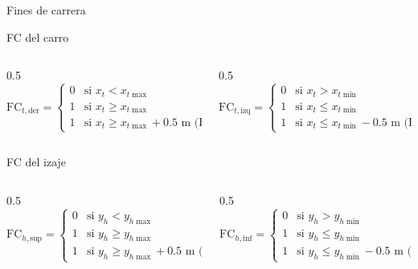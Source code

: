 \begin{frame}{Fines de carrera}
  \begin{block}{FC del carro}
    \vspace{0.2cm}
    \begin{columns}[T]
      \begin{column}{0.5\textwidth}
        \[
        \text{FC}_{t,\text{der}} = 
        \begin{cases} 
          0 & \text{si } x_t < x_{t\max} \\[4pt]
          1 & \text{si } x_t \ge x_{t\max} \\[4pt]
          1 & \text{si } x_t \ge x_{t\max} + 0.5 \text{ m (E)}
        \end{cases}
        \]
      \end{column}
      \begin{column}{0.5\textwidth}
        \[
        \text{FC}_{t,\text{izq}} = 
        \begin{cases} 
          0 & \text{si } x_t > x_{t\min} \\
          1 & \text{si } x_t \le x_{t\min} \\[4pt]
          1 & \text{si } x_t \le x_{t\min} - 0.5 \text{ m (E)}
        \end{cases}
        \]
      \end{column}
    \end{columns}
  \end{block}
    \begin{block}{FC del izaje}
    \vspace{0.2cm}
    \begin{columns}[T]
      \begin{column}{0.5\textwidth}
        \[
        \text{FC}_{h,\text{sup}} = 
        \begin{cases} 
          0 & \text{si } y_h < y_{h\max} \\[4pt]
          1 & \text{si } y_h \ge y_{h\max} \\[4pt]
          1 & \text{si } y_h \ge y_{h\max} + 0.5 \text{ m (E)}
        \end{cases}
        \]
      \end{column}
      \begin{column}{0.5\textwidth}
        \[
        \text{FC}_{h,\text{inf}} = 
        \begin{cases} 
          0 & \text{si } y_h > y_{h\min} \\[4pt]
          1 & \text{si } y_h \le y_{h\min}  \\[4pt]
          1 & \text{si } y_h \le y_{h\min} - 0.5 \text{ m (E)}
        \end{cases}
        \]
      \end{column}
    \end{columns}
  \end{block}
\end{frame}




